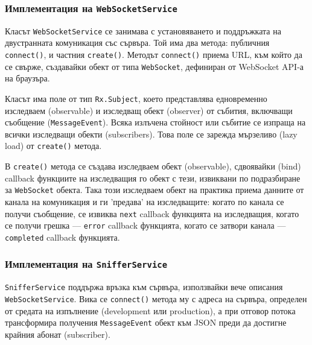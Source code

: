 \documentclass[12pt,a4paper,oneside]{book}
\begin{document}
\subsubsection{Имплементация на \texttt{WebSocketService}}

Класът \texttt{WebSocketService} се занимава с установяването и поддръжката на
двустранната комуникация със сървъра. Той има два метода:
публичния \texttt{connect()}, и частния \texttt{create()}.
Методът \texttt{connect()} приема URL, към който да се свърже,
създавайки обект от типа \texttt{WebSocket}, дефиниран от WebSocket
API-а на браузъра.

Класът има поле от тип \texttt{Rx.Subject}, което представлява едновременно
изследваем (observable) и изследващ обект (observer) от събития, включващи
съобщение (\texttt{MessageEvent}). Всяка излъчена стойност или
събитие се изпраща на всички изследващи обекти (subscribers). Това
поле се зарежда мързеливо (lazy load) от \texttt{create()} метода.



В \texttt{create()} метода се създава изследваем обект
(observable), сдвоявайки (bind) callback функциите на изследващия го обект с
тези, извиквани по подразбиране за \texttt{WebSocket} обекта. Така този изследваем
обект на практика приема данните от канала на комуникация и ги 'предава' на
изследващите: когато по канала се получи съобщение, се извиква \texttt{next}
callback функцията на
изследващия, когато се получи грешка --- \texttt{error} callback функцията, когато се затвори
канала --- \texttt{completed} callback функцията.



\subsubsection{Имплементация на \texttt{SnifferService}}

\texttt{SnifferService} поддържа връзка към сървъра, използвайки вече описания
\texttt{WebSocketService}. Вика се \texttt{connect()} метода му с адреса
на сървъра, определен от средата на изпълнение (development или production),
а при отговор потока трансформира получения \texttt{MessageEvent} обект към JSON преди да достигне крайния абонат (subscriber).
\end{document}
